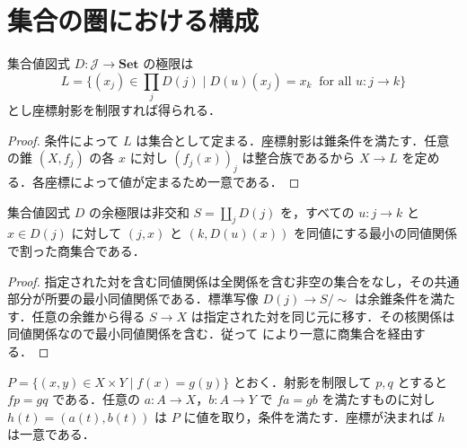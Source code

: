 \section{集合の圏における構成}
\begin{prop}[集合値図式の極限]
集合値図式 $D:\mathcal J\to\mathbf{Set}$ の極限は
\[
 L=\{(x_j)\in\prod_jD(j)\mid
 D(u)(x_j)=x_k\ \text{ for all }u:j\to k\}
\]
とし座標射影を制限すれば得られる．
\end{prop}
\begin{proof}
条件によって $L$ は集合として定まる．座標射影は錐条件を満たす．任意の錐 $(X,f_j)$ の各 $x$ に対し $(f_j(x))_j$ は整合族であるから $X\to L$ を定める．各座標によって値が定まるため一意である．
\end{proof}
\begin{prop}[集合値図式の余極限]
集合値図式 $D$ の余極限は非交和 $S=\coprod_j D(j)$ を，すべての $u:j\to k$ と $x\in D(j)$ に対して $(j,x)$ と $(k,D(u)(x))$ を同値にする最小の同値関係で割った商集合である．
\end{prop}
\begin{proof}
指定された対を含む同値関係は全関係を含む非空の集合をなし，その共通部分が所要の最小同値関係である．標準写像 $D(j)\to S/{\sim}$ は余錐条件を満たす．任意の余錐から得る $S\to X$ は指定された対を同じ元に移す．その核関係は同値関係なので最小同値関係を含む．従って  により一意に商集合を経由する．
\end{proof}
\begin{prop}[集合の引戻し]
$P=\{(x,y)\in X\times Y\mid f(x)=g(y)\}$ とおく．射影を制限して $p,q$ とすると $fp=gq$ である．任意の $a:A\to X$，$b:A\to Y$ で $fa=gb$ を満たすものに対し $h(t)=(a(t),b(t))$ は $P$ に値を取り，条件を満たす．座標が決まれば $h$ は一意である．
\end{prop}
